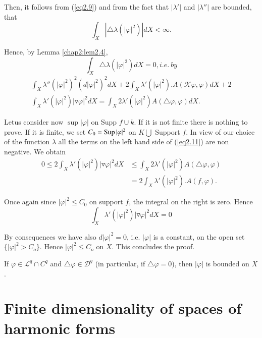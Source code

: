 Then, it follows from (\ref{eq2.9}) and from the fact that $|\lambda'|$ and
$|\lambda''|$ are bounded, that
$$
\int_X |\triangle \lambda (|\varphi |^2)|dX < \infty. 
$$

Hence, by Lemma  \ref{chap2:lem2.4},
\begin{equation*}
  \int_X \triangle \lambda(|\varphi|^2)dX=0 , i.e.~ by  \tag{2.9}\label{eq2.9} 
\end{equation*}
\begin{multline*}
  \int_X \lambda''(| \varphi|^2)^2 (d| \varphi |^2)^2 dX +2 \int_X
  \lambda '(|\varphi |^2). A(\mathcal{K}\varphi , \varphi)dX 
  +2\\ \int_X \lambda'(|\varphi|^2)|\triangledown \varphi|^2 dX 
  =\int_X 2 \lambda' (|\varphi|^2)A(\triangle \varphi,
  \varphi)dX.\tag{2.11}\label{eq2.11}  
\end{multline*}

Let\pageoriginale us consider now $\sup |\varphi|$ on Supp $f\cup
k$. If it is not 
finite there is nothing to prove. If it is finite, we set
$C_0=\operatorname{Sup}  |\varphi|^2$ on $K \bigcup$ Support $f$. In view of our
choice of the function $\lambda$ all the terms on the left hand side
of (\ref{eq2.11}) are non negative. We obtain 
\begin{align*}
  0 \leqslant 2 \int_X \lambda' (|\varphi | ^2)|\triangledown \varphi
  |^2 d X & \leqslant \int_X 2 \lambda ' (| \varphi |^2)A (\triangle
  \varphi, \varphi)\\ 
  & =2 \int_X \lambda' (|\varphi |^2).A(f, \varphi).
\end{align*}

Once again since $| \varphi |^2 \leqslant C_0$ on support $f$, the
integral on the right is zero. Hence 
$$
\int_X \lambda '(|\varphi|^2)| \triangledown \varphi |^2 dX=0
$$

By consequences we have also $d| \varphi |^2=0$, i.e.  $| \varphi |$
is a constant, on the open set $\{ | \varphi |^2 > C_o \}$. Hence
$|\varphi |^2 \le C_o$ on $X$. This concludes the proof. 

\begin{coro*}
  If $ \varphi \in \mathcal{L}^q \cap C^q$ and $\triangle \varphi \in
  \mathscr{D}^q $ (in particular, if $\triangle \varphi =0$), then
  $|\varphi |$ is bounded on $X$. 
\end{coro*}


\section{Finite dimensionality of spaces of harmonic forms}%

